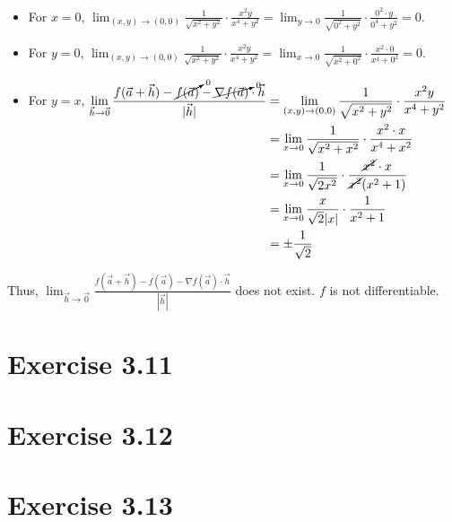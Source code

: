 \documentclass[11pt,fleqn]{book} %
\begin{document}
\begin{itemize}
    \item For $x = 0$, $\lim_{(x,y)\to(0,0)} \frac{1}{\sqrt{x^2+y^2}} \cdot \frac{x^2y}{x^4 + y^2} = \lim_{y\to0} \frac{1}{\sqrt{0^2+y^2}} \cdot \frac{0^2 \cdot y}{0^4 + y^2} = 0$. 
    \item For $y = 0$, $\lim_{(x,y)\to(0,0)} \frac{1}{\sqrt{x^2+y^2}} \cdot \frac{x^2y}{x^4 + y^2} = \lim_{x\to0} \frac{1}{\sqrt{x^2+0^2}} \cdot \frac{x^2 \cdot 0}{x^4 + 0^2} = 0$. 
    \item For $y = x$, $\begin{aligned}[t]
        \lim_{\vec{h}\to\vec{0}} \frac{f(\vec{a} + \vec{h}) - \cancelto{0}{f(\vec{a})} - \cancelto{0}{\nabla f(\vec{a})} \cdot \vec{h}}{| \vec{h} |}
         & = \lim_{(x,y)\to(0,0)} \frac{1}{\sqrt{x^2+y^2}} \cdot \frac{x^2y}{x^4 + y^2}                   \\
         & = \lim_{x\to0} \frac{1}{\sqrt{x^2 + x^2}} \cdot \frac{x^2 \cdot x}{x^4 + x^2}                  \\
         & = \lim_{x\to0} \frac{1}{\sqrt{2x^2}} \cdot \frac{\cancel{x^2} \cdot x}{\cancel{x^2} (x^2 + 1)} \\
         & = \lim_{x\to0} \frac{x}{\sqrt{2}|x|} \cdot \frac{1}{x^2 + 1}                                   \\
         & = \pm \frac{1}{\sqrt{2}}
    \end{aligned}$
\end{itemize}

Thus, $\lim_{\vec{h}\to\vec{0}} \frac{f(\vec{a} + \vec{h}) - f(\vec{a}) - \nabla f(\vec{a}) \cdot \vec{h}}{| \vec{h} |}$ does not exist. $f$ is not differentiable. 

\section*{Exercise 3.11}

\section*{Exercise 3.12}

\section*{Exercise 3.13}

\end{document}
